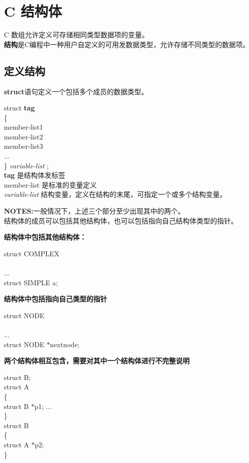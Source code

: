 \documentclass[UTF8]{ctexart}
\begin{document}
			\clearpage
			\section{C 结构体}
			C 数组允许定义可存储相同类型数据项的变量。\\ \textbf{结构}是C编程中一种用户自定义的可用发数据类型，允许存储不同类型的数据项。
			\subsection{定义结构}
			\textbf{struct}语句定义一个包括多个成员的数据类型。
			\begin{framed}
				struct \textbf{tag} \\
				\{\\
					member-list1\\
					member-list2\\
					member-list3\\
					...\\
				\} \emph{variable-list} ;\\
				\textbf{tag} 是结构体发标签\\
				member-list 是标准的变量定义\\
				\emph{variable-list} 结构变量，定义在结构的末尾，可指定一个或多个结构变量。
			\end{framed}

			\textbf{NOTES:}一般情况下，上述三个部分至少出现其中的两个。\\结构体的成员可以包括其他结构体，也可以包括指向自己结构体类型的指针。\begin{framed}
				\textbf{结构体中包括其他结构体：}\begin{framed}
						struct COMPLEX\\
						{\\
							...\\
							struct SIMPLE a;\\
						}
					\end{framed}
					\textbf{结构体中包括指向自己类型的指针}\begin{framed}
						struct NODE\\
						{\\
							...\\
							struct NODE $*$nextnode;\\
						}
					\end{framed}
					\textbf{两个结构体相互包含，需要对其中一个结构体进行不完整说明}\begin{framed}
						 struct B;\\

						 struct A\\
						 \{\\
							 struct B $*$p1;
							 ...\\
						 \}\\
						 struct B\\
						 \{\\
							struct A $*$p2;\\
						 \}
					\end{framed}
			\end{framed}
\end{document}
